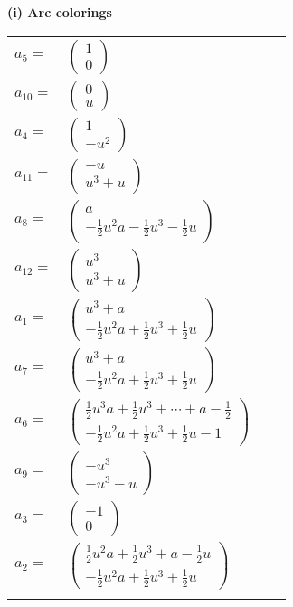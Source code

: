\documentclass[1p]{elsarticle_modified}
\theoremstyle{definition}
\begin{document}
\flushleft \textbf{(i) Arc colorings}\\
\begin{tabular}{m{7pt} m{180pt} m{7pt} m{180pt} }
\flushright $a_{5}=$&$\begin{pmatrix}1\\0\end{pmatrix}$ \\
\flushright $a_{10}=$&$\begin{pmatrix}0\\u\end{pmatrix}$ \\
\flushright $a_{4}=$&$\begin{pmatrix}1\\- u^2\end{pmatrix}$ \\
\flushright $a_{11}=$&$\begin{pmatrix}- u\\u^3+u\end{pmatrix}$ \\
\flushright $a_{8}=$&$\begin{pmatrix}a\\-\frac{1}{2} u^2 a-\frac{1}{2} u^3-\frac{1}{2} u\end{pmatrix}$ \\
\flushright $a_{12}=$&$\begin{pmatrix}u^3\\u^3+u\end{pmatrix}$ \\
\flushright $a_{1}=$&$\begin{pmatrix}u^3+a\\-\frac{1}{2} u^2 a+\frac{1}{2} u^3+\frac{1}{2} u\end{pmatrix}$ \\
\flushright $a_{7}=$&$\begin{pmatrix}u^3+a\\-\frac{1}{2} u^2 a+\frac{1}{2} u^3+\frac{1}{2} u\end{pmatrix}$ \\
\flushright $a_{6}=$&$\begin{pmatrix}\frac{1}{2} u^3 a+\frac{1}{2} u^3+\cdots+a-\frac{1}{2}\\-\frac{1}{2} u^2 a+\frac{1}{2} u^3+\frac{1}{2} u-1\end{pmatrix}$ \\
\flushright $a_{9}=$&$\begin{pmatrix}- u^3\\- u^3- u\end{pmatrix}$ \\
\flushright $a_{3}=$&$\begin{pmatrix}-1\\0\end{pmatrix}$ \\
\flushright $a_{2}=$&$\begin{pmatrix}\frac{1}{2} u^2 a+\frac{1}{2} u^3+a-\frac{1}{2} u\\-\frac{1}{2} u^2 a+\frac{1}{2} u^3+\frac{1}{2} u\end{pmatrix}$\\&\end{tabular}
\end{document}
